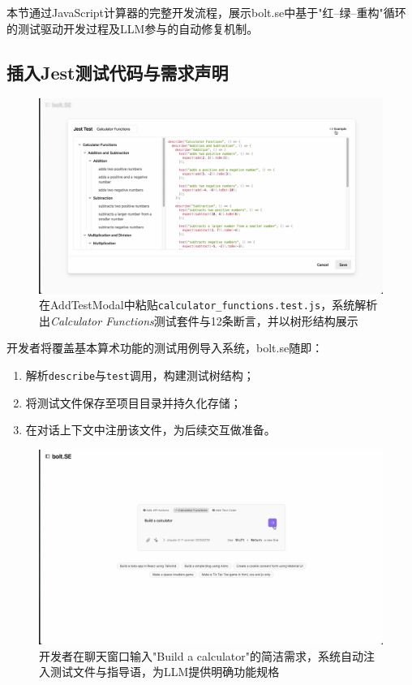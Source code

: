 本节通过JavaScript计算器的完整开发流程，展示bolt.se中基于"红–绿–重构"循环的测试驱动开发过程及LLM参与的自动修复机制。

\subsection{插入Jest测试代码与需求声明}

\begin{figure}[htbp]
  \centering
  \includegraphics[width=.9\textwidth]{figures/screenshots/tdd/add_test_modal.png}
  \caption{在AddTestModal中粘贴\texttt{calculator\_functions.test.js}，系统解析出\textit{Calculator Functions}测试套件与12条断言，并以树形结构展示}
  \label{fig:tdd_add_test}
\end{figure}

开发者将覆盖基本算术功能的测试用例导入系统，bolt.se随即：

\begin{enumerate}
  \item 解析\verb|describe|与\verb|test|调用，构建测试树结构；
  \item 将测试文件保存至项目目录并持久化存储；
  \item 在对话上下文中注册该文件，为后续交互做准备。
\end{enumerate}

\begin{figure}[htbp]
  \centering
  \includegraphics[width=.9\textwidth]{figures/screenshots/tdd/calculator_prompt.png}
  \caption{开发者在聊天窗口输入"Build a calculator"的简洁需求，系统自动注入测试文件与指导语，为LLM提供明确功能规格}
  \label{fig:tdd_prompt}
\end{figure}

